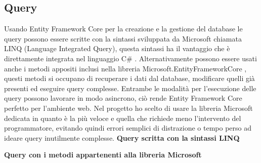 \subsection{Query}
Usando Entity Framework Core per la creazione e la gestione del database le query possono essere scritte con la sintassi sviluppata da Microsoft chiamata LINQ (Language Integrated Query), questa sintassi ha il vantaggio che è direttamente integrata nel linguaggio C\# \cite{LINQ}. Alternativamente possono essere usati anche i metodi appositi inclusi nella libreria Microsoft.EntityFrameworkCore \cite{Microsoft.EFcore}, questi metodi si occupano di recuperare i dati dal database, modificare quelli già presenti ed eseguire query complesse. Entrambe le modalità per l'esecuzione delle query possono lavorare in modo asincrono, ciò rende Entity Framework Core perfetto per l'ambiente web. Nel progetto ho scelto di usare la libreria Microsoft dedicata in quanto è la più veloce e quella che richiede meno l'intervento del programmatore, evitando quindi errori semplici di distrazione o tempo perso ad ideare query inutilmente complesse. 
\clearpage
\textbf{Query scritta con la sintassi LINQ}

\bigskip
\bigskip

\textbf{Query con i metodi appartenenti alla libreria Microsoft}
